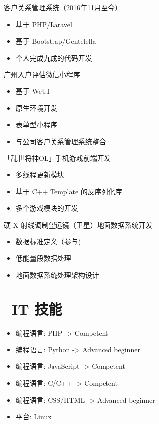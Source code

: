 \documentclass{resume}
\begin{document}
\begin{onehalfspacing}
客户关系管理系统（2016年11月至今）
\begin{itemize}
  \item 基于 PHP/Laravel
  \item 基于 Bootstrap/Gentelella
  \item 个人完成九成的代码开发
\end{itemize}
\end{onehalfspacing}
\begin{onehalfspacing}
广州入户评估微信小程序
\begin{itemize}
  \item 基于 WeUI
  \item 原生环境开发
  \item 表单型小程序
  \item 与公司客户关系管理系统整合
\end{itemize}
\end{onehalfspacing}

\begin{onehalfspacing}
「乱世将神OL」手机游戏前端开发
\begin{itemize}
  \item 多线程更新模块
  \item 基于 C++ Template 的反序列化库
  \item 多个游戏模块的开发
\end{itemize}
\end{onehalfspacing}

硬 X 射线调制望远镜（卫星）地面数据系统开发
\begin{itemize}
  \item 数据标准定义（参与)
  \item 低能量段数据处理
  \item 地面数据系统处理架构设计
\end{itemize}

\section{\faCogs\ IT 技能}
\begin{itemize}[parsep=0.5ex]
  \item 编程语言: PHP -> Competent
  \item 编程语言: Python -> Advanced beginner
  \item 编程语言: JavaScript -> Competent
  \item 编程语言: C/C++ -> Competent
  \item 编程语言: CSS/HTML -> Advanced beginner
  \item 平台: Linux
\end{itemize}
\end{document}
